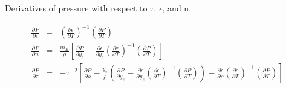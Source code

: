 Derivatives of pressure with respect to $\tau$, $\epsilon$, and n. \\
\begin{footnotesize}
\begin{eqnarray}
	\frac{\partial{P}}{\partial{\epsilon}} &=& \left(\frac{\partial{\epsilon}}{\partial{T}}\right)^{-1}\left(\frac{\partial{P}}{\partial{T}}\right) \\
	\frac{\partial{P}}{\partial{n}} &=& \frac{m_B}{\rho} \left[ \frac{\partial{P}}{\partial{y_e}} -
          \frac{\partial{\epsilon}}{\partial{y_e}}\left(\frac{\partial{\epsilon}}{\partial{T}}\right)^{-1}\left(\frac{\partial{P}}{\partial{T}}\right)\right]\\
	\frac{\partial{P}}{\partial{\tau}} &=& -\tau^{-2} \left[ \frac{\partial{P}}{\partial{\rho}} - \frac{y_e}{\rho} \left( \frac{\partial{P}}{\partial{y_e}} -
          \frac{\partial{\epsilon}}{\partial{y_e}} \left(\frac{\partial{\epsilon}}{\partial{T}}\right)^{-1}\left(\frac{\partial{P}}{\partial{T}}\right)\right) -
          \frac{\partial{\epsilon}}{\partial{\rho}}\left(\frac{\partial{\epsilon}}{\partial{T}}\right)^{-1}\left(\frac{\partial{P}}{\partial{T}}\right)\right]
\end{eqnarray}
\end{footnotesize}
